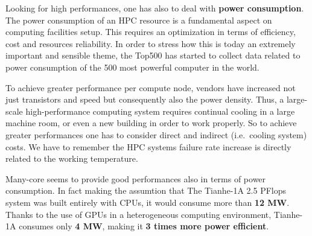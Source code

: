 




Looking for high performances, one has also to deal with {\bf power consumption}. The power consumption of an HPC resource is a fundamental aspect on computing facilities setup. This requires an optimization  in terms of efficiency, cost and resources reliability. In order to stress how this is today an extremely important and sensible theme, the Top500 has started to collect data related to power consumption of the 500 most powerful computer in the world.

To achieve greater performance per compute node, vendors have increased not just 
transistors and speed but consequently also the power density. Thus, a large-scale 
high-performance computing system requires continual cooling in a 
large machine room, or even a new building in order to work properly. So to achieve greater performances one has  
to consider direct and indirect (i.e.\ cooling system) costs. We have to remember the HPC systems failure rate  increase is  directly related to the working temperature. 


Many-core seems to provide good performances also in terms of power consumption. In fact making the assumtion that The Tianhe-1A 2.5 PFlops system was built entirely with CPUs, it would consume more 
than {\bf 12 MW}. Thanks to the use of GPUs in a heterogeneous computing environment, Tianhe-1A consumes only {\bf 4 MW}, making it {\bf 3 times more power efficient}. %

